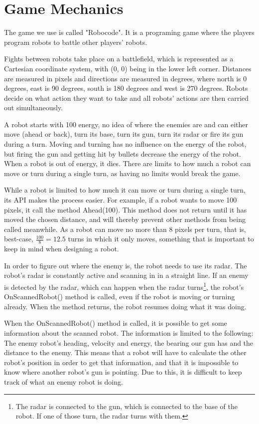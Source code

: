 \section{Game Mechanics}
\label{03}

The game we use is called "Robocode"\cite{robocode}. It is a programing game where the players program robots to battle other players' robots. 

Fights between robots take place on a battlefield, which is represented as a Cartesian coordinate system, with (0, 0) being in the lower left corner. Distances are measured in pixels and directions are measured in degrees, where north is 0 degrees, east is 90 degrees, south is 180 degrees and west is 270 degrees. Robots decide on what action they want to take and all robots' actions are then carried out simultaneously.

A robot starts with 100 energy, no idea of where the enemies are and can either move (ahead or back), turn its base, turn its gun, turn its radar or fire its gun during a turn. Moving and turning has no influence on the energy of the robot, but firing the gun and getting hit by bullets decrease the energy of the robot. When a robot is out of energy, it dies. There are limits to how much a robot can move or turn during a single turn\cite{wiki:robocodeGamePhysics}, as having no limits would break the game.

While a robot is limited to how much it can move or turn during a single turn, its API\cite{robocodeAPI} makes the process easier. For example, if a robot wants to move 100 pixels, it call the method Ahead(100). This method does not return until it has moved the chosen distance, and will thereby prevent other methods from being called meanwhile. As a robot can move no more than 8 pixels per turn, that is, best-case, $\frac{100}{8} = 12.5$ turns in which it only moves, something that is important to keep in mind when designing a robot.

In order to figure out where the enemy is, the robot needs to use its radar. The robot's radar is constantly active and scanning in in a straight line. If an enemy is detected by the radar, which can happen when the radar turns\footnote{The radar is connected to the gun, which is connected to the base of the robot. If one of those turn, the radar turns with them.}, the robot's OnScannedRobot() method is called, even if the robot is moving or turning already. When the method returns, the robot resumes doing what it was doing.

When the OnScannedRobot() method is called, it is possible to get some information about the scanned robot. The information is limited to the following: The enemy robot's heading, velocity and energy, the bearing our gun has and the distance to the enemy. This means that a robot will have to calculate the other robot's position in order to get that information, and that it is impossible to know where another robot's gun is pointing. Due to this, it is difficult to keep track of what an enemy robot is doing.

